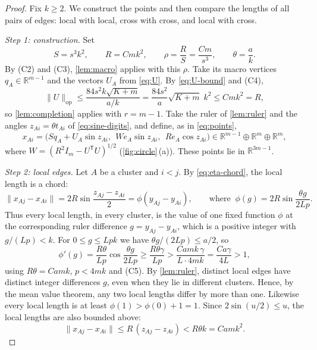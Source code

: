 \documentclass[11pt]{amsart}
\numberwithin{equation}{section}
\theoremstyle{definition}
\theoremstyle{remark}
\newcommand{\R}{\mathbb R}
\newcommand{\norm}[1]{\lVert #1\rVert}
\newcommand{\opnorm}[1]{\lVert #1\rVert_{\mathrm{op}}}
\newcommand{\T}{\mathsf T}          %
\newcommand{\cond}[1]{\textup{(C#1)}}
\begin{document}
\begin{proof}
Fix $k\ge2$. We construct the points and then compare the lengths of all
pairs of edges: local with local, cross with cross, and local with cross.

\smallskip\noindent\emph{Step 1: construction.}
Set
\begin{equation}\label{eq:scales}
 S=s^3k^2,\qquad R=Cmk^2,\qquad
 \rho=\frac RS=\frac{Cm}{s^3},\qquad \theta=\frac ak.
\end{equation}
By \cond2 and \cond3, \cref{lem:macro} applies with this $\rho$. Take its
macro vertices $q_A\in\R^{m-1}$ and the vectors $U_A$ from
\eqref{eq:U}. By \eqref{eq:U-bound} and \cond4,
\[
 \opnorm U\le\frac{84s^2k\sqrt{K+m}}{a/k}
 =\frac{84s^2}{a}\sqrt{K+m}\;k^2\le Cmk^2=R,
\]
so \cref{lem:completion} applies with $r=m-1$. Take the ruler of
\cref{lem:ruler} and the angles $z_{Ai}=\theta t_{Ai}$ of
\eqref{eq:sine-digits}, and define, as in \eqref{eq:points},
\begin{equation}\label{eq:actual-point}
 x_{Ai}=\bigl(Sq_A+U_A\sin z_{Ai},\ \ We_A\sin z_{Ai},\ \ Re_A\cos z_{Ai}\bigr)
 \in\R^{m-1}\oplus\R^m\oplus\R^m,
\end{equation}
where $W=(R^2I_m-U^\T U)^{1/2}$ (\cref{fig:circle}\,(a)). These points lie in
$\R^{3m-1}$.

\smallskip\noindent\emph{Step 2: local edges.}
Let $A$ be a cluster and $i<j$. By \eqref{eq:eta-chord}, the local length
is a chord:
\begin{equation}\label{eq:local-metric}
 \norm{x_{Aj}-x_{Ai}}=2R\sin\frac{z_{Aj}-z_{Ai}}2
 =\phi(y_{Aj}-y_{Ai}),
 \qquad\text{where }\ \phi(g)=2R\sin\frac{\theta g}{2Lp}.
\end{equation}
Thus every local length, in every cluster, is the value of one fixed
function $\phi$ at the corresponding ruler difference $g=y_{Aj}-y_{Ai}$,
which is a positive integer with $g/(Lp)<k$. For $0\le g\le Lpk$ we have
$\theta g/(2Lp)\le a/2$, so
\[
 \phi'(g)=\frac{R\theta}{Lp}\cos\frac{\theta g}{2Lp}
 \ge\frac{R\theta\gamma}{Lp}
 >\frac{Camk\,\gamma}{L\cdot4mk}
 =\frac{Ca\gamma}{4L}>1,
\]
using $R\theta=Camk$, $p<4mk$ and \cond5. By \cref{lem:ruler}, distinct
local edges have distinct integer differences $g$, even when they lie in
different clusters. Hence, by the mean value theorem, any two local
lengths differ by more than one. Likewise every local length is at least
$\phi(1)>\phi(0)+1=1$. Since $2\sin(u/2)\le u$, the local lengths are also
bounded above:
\begin{equation}\label{eq:local-upper}
 \norm{x_{Aj}-x_{Ai}}\le R\,(z_{Aj}-z_{Ai})< R\theta k=Camk^2.
\end{equation}


\end{proof}
\end{document}

